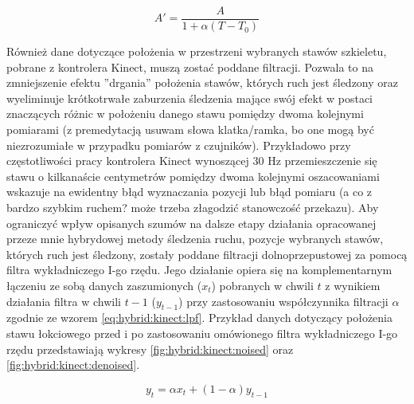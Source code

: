 \begin{equation}
A' = \frac{A}{1+\alpha(T-T_0)}
\label{eq:hybrid:temperatureCorrection}
\end{equation}

Również dane dotyczące położenia w przestrzeni wybranych stawów szkieletu, pobrane z kontrolera Kinect, muszą zostać poddane filtracji. Pozwala to na zmniejszenie efektu ''drgania'' położenia stawów, których ruch jest śledzony oraz wyeliminuje krótkotrwałe zaburzenia śledzenia mające swój efekt w postaci znaczących różnic w położeniu danego stawu pomiędzy dwoma kolejnymi pomiarami (z premedytacją usuwam słowa klatka/ramka, bo one mogą być niezrozumiałe w przypadku pomiarów z czujników). Przykładowo przy częstotliwości pracy kontrolera Kinect wynoszącej 30 Hz przemieszczenie się stawu o kilkanaście centymetrów pomiędzy dwoma kolejnymi oszacowaniami wskazuje na ewidentny błąd wyznaczania pozycji lub błąd pomiaru (a co z bardzo szybkim ruchem? może trzeba złagodzić stanowczość przekazu). Aby ograniczyć wpływ opisanych szumów na dalsze etapy działania opracowanej przeze mnie hybrydowej metody śledzenia ruchu, pozycje wybranych stawów, których ruch jest śledzony, zostały poddane filtracji dolnoprzepustowej za pomocą filtra wykładniczego I-go rzędu. Jego działanie opiera się na komplementarnym łączeniu ze sobą danych zaszumionych ($x_t$) pobranych w chwili $t$ z wynikiem działania filtra w chwili $t-1$ ($y_{t-1}$) przy zastosowaniu współczynnika filtracji $\alpha$ zgodnie ze wzorem \eqref{eq:hybrid:kinect:lpf}. Przykład danych dotyczący położenia stawu łokciowego przed i po zastosowaniu omówionego filtra wykładniczego I-go rzędu przedstawiają wykresy \ref{fig:hybrid:kinect:noised} oraz \ref{fig:hybrid:kinect:denoised}.

\begin{equation}
\label{eq:hybrid:kinect:lpf}
y_t = \alpha x_t + (1-\alpha)y_{t-1}
\end{equation}

